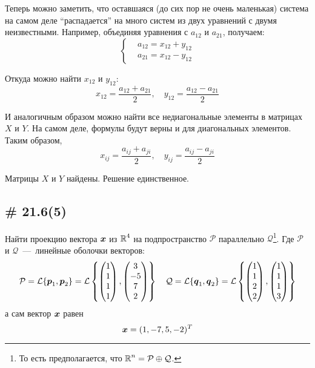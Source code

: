 \documentclass[a4paper,12pt]{article}
\begin{document}
\begin{solution}
    Теперь можно заметить, что оставшаяся (до сих пор не очень маленькая) система на самом деле ``распадается'' на много систем из двух уравнений с двумя неизвестными.
    Например, объединяя уравнения с $a_{12}$ и $a_{21}$, получаем:
    \[
      \left\{
        \begin{aligned}
          &a_{12} = x_{12} + y_{12}\\
          &a_{21} = x_{12} - y_{12}
        \end{aligned}
      \right.
    \]
    
    Откуда можно найти $x_{12}$ и $y_{12}$:
    \[
      x_{12} = \frac{a_{12} + a_{21}}{2},\quad y_{12} = \frac{a_{12} - a_{21}}{2}
    \]
    
    И аналогичным образом можно найти все недиагональные элементы в матрицах $X$ и $Y$.
    На самом деле, формулы будут верны и для диагональных элементов.
    Таким образом,
    \[
      x_{ij} = \frac{a_{ij} + a_{ji}}{2},\quad y_{ij} = \frac{a_{ij} - a_{ji}}{2}
    \]
    
    Матрицы $X$ и $Y$ найдены.
    Решение единственное.
  \end{solution}
  
  
  \subsection{\# 21.6(5)}
  
  Найти проекцию вектора $\boldsymbol x$ из $\operatorname{\mathbb R}^4$ на подпространство $\mathcal P$ параллельно $\mathcal Q$\footnote{То есть предполагается, что $\RR^n = \mathcal P \hm\oplus \mathcal Q$.}.
  Где $\mathcal P$ и $\mathcal Q$~---~линейные оболочки векторов:
  \[
    \mathcal P = \mathcal L \{\boldsymbol p_1, \boldsymbol p_2\} = \mathcal L \left\{
      \begin{pmatrix}
        1 \\ 1 \\ 1 \\ 1
      \end{pmatrix},
      \begin{pmatrix}
        3 \\ -5 \\ 7 \\ 2
      \end{pmatrix}
    \right\}
    \quad \mathcal Q = \mathcal L \{\boldsymbol q_1, \boldsymbol q_2\}  = \mathcal L \left\{
      \begin{pmatrix}
        1 \\ 1 \\ 2 \\ 2
      \end{pmatrix},
      \begin{pmatrix}
        1 \\ 1 \\ 1 \\ 3
      \end{pmatrix}
    \right\}
  \]
  а сам вектор $\boldsymbol x$ равен
  \[
    \boldsymbol x = (1, -7, 5, -2)^T
  \]
  
\end{document}
